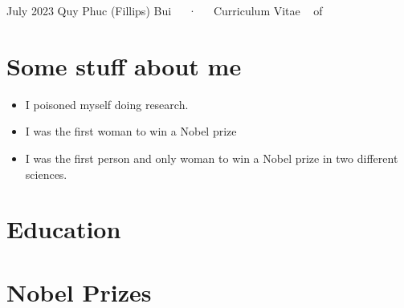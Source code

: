 \documentclass[11pt,a4paper,]{awesome-cv}
\providecommand{\tightlist}{%
	\setlength{\itemsep}{0pt}\setlength{\parskip}{0pt}}
\begin{document}
\makecvheader

\makecvfooter
  {July 2023}
    {Quy Phuc (Fillips) Bui~~~·~~~Curriculum Vitae}
  {\thepage~ of \pageref{LastPage}~}





\hypertarget{some-stuff-about-me}{%
\section{Some stuff about me}\label{some-stuff-about-me}}

\begin{itemize}
\tightlist
\item
  I poisoned myself doing research.
\item
  I was the first woman to win a Nobel prize
\item
  I was the first person and only woman to win a Nobel prize in two
  different sciences.
\end{itemize}

\hypertarget{education}{%
\section{Education}\label{education}}

\begin{cventries}
    \vspace{-4.0mm}
    \vspace{-4.0mm}
    \vspace{-4.0mm}
\end{cventries}

\hypertarget{nobel-prizes}{%
\section{Nobel Prizes}\label{nobel-prizes}}
\end{document}
